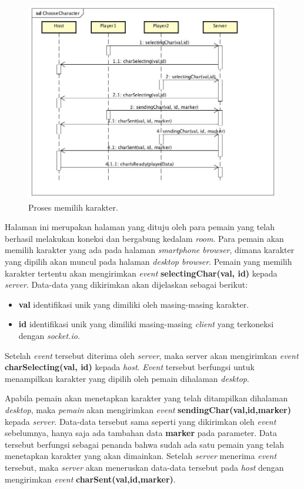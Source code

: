 \begin{figure}[H]
	\centering
	\includegraphics[scale=0.3]{Gambar/ChooseCharacter}
	\caption{Proses memilih karakter.}
	\label{fig:2_ChooseCharacter}
\end{figure}

Halaman ini merupakan halaman yang dituju oleh para pemain yang telah berhasil melakukan koneksi dan bergabung kedalam \textit{room}. Para pemain akan memilih karakter yang ada pada halaman \textit{smartphone browser}, dimana karakter yang dipilih akan muncul pada halaman \textit{desktop browser}. Pemain yang memilih karakter tertentu akan mengirimkan \textit{event} \textbf{selectingChar(val, id)} kepada \textit{server}. Data-data yang dikirimkan akan dijelaskan sebagai berikut:
\begin{itemize}
	\item \textbf{val} identifikasi unik yang dimiliki oleh masing-masing karakter.
	\item \textbf{id} identifikasi unik yang dimiliki masing-masing \textit{client} yang terkoneksi dengan \textit{socket.io}.
\end{itemize}
Setelah \textit{event} tersebut diterima oleh \textit{server}, maka server akan mengirimkan \textit{event} \textbf{charSelecting(val, id)} kepada \textit{host}. \textit{Event} tersebut berfungsi untuk menampilkan karakter yang dipilih oleh pemain dihalaman \textit{desktop}.

Apabila pemain akan menetapkan karakter yang telah ditampilkan dihalaman \textit{desktop}, maka \textit{pemain} akan mengirimkan \textit{event} \textbf{sendingChar(val,id,marker)} kepada \textit{server}. Data-data tersebut sama seperti yang dikirimkan oleh \textit{event} sebelumnya, hanya saja ada tambahan data \textbf{marker} pada parameter. Data tersebut berfungsi sebagai penanda bahwa sudah ada satu pemain yang telah menetapkan karakter yang akan dimainkan. Setelah \textit{server} menerima \textit{event} tersebut, maka \textit{server} akan meneruskan data-data tersebut pada \textit{host} dengan mengirimkan \textit{event} \textbf{charSent(val,id,marker)}.

